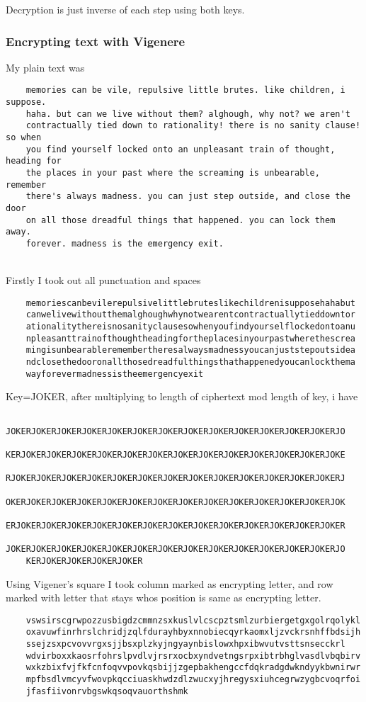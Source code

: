 \documentclass[10pt]{article}
\begin{document}
  Decryption is just inverse of each step using both keys.

  \subsubsection{Encrypting text with Vigenere}
  My plain text was 
  \begin{verbatim}
  	memories can be vile, repulsive little brutes. like children, i suppose.
  	haha. but can we live without them? alghough, why not? we aren't 
  	contractually tied down to rationality! there is no sanity clause! so when
  	you find yourself locked onto an unpleasant train of thought, heading for
  	the places in your past where the screaming is unbearable, remember
  	there's always madness. you can just step outside, and close the door
  	on all those dreadful things that happened. you can lock them away.
  	forever. madness is the emergency exit.
  \end{verbatim} \\
  Firstly I took out all punctuation and spaces \\
  \begin{verbatim}
  	memoriescanbevilerepulsivelittlebruteslikechildrenisupposehahabut
  	canwelivewithoutthemalghoughwhynotwearentcontractuallytieddowntor
  	ationalitythereisnosanityclausesowhenyoufindyourselflockedontoanu
  	npleasanttrainofthoughtheadingfortheplacesinyourpastwherethescrea
  	mingisunbearableremembertheresalwaysmadnessyoucanjuststepoutsidea
  	ndclosethedooronallthosedreadfulthingsthathappenedyoucanlockthema
  	wayforevermadnessistheemergencyexit
  \end{verbatim}
  Key=JOKER, after multiplying to length of ciphertext mod length of key, i have
  \begin{verbatim}
  	JOKERJOKERJOKERJOKERJOKERJOKERJOKERJOKERJOKERJOKERJOKERJOKERJOKERJO
  	KERJOKERJOKERJOKERJOKERJOKERJOKERJOKERJOKERJOKERJOKERJOKERJOKERJOKE
  	RJOKERJOKERJOKERJOKERJOKERJOKERJOKERJOKERJOKERJOKERJOKERJOKERJOKERJ
  	OKERJOKERJOKERJOKERJOKERJOKERJOKERJOKERJOKERJOKERJOKERJOKERJOKERJOK
  	ERJOKERJOKERJOKERJOKERJOKERJOKERJOKERJOKERJOKERJOKERJOKERJOKERJOKER
  	JOKERJOKERJOKERJOKERJOKERJOKERJOKERJOKERJOKERJOKERJOKERJOKERJOKERJO
  	KERJOKERJOKERJOKERJOKER
  \end{verbatim}

  Using Vigener's square I took column marked as encrypting letter, and row marked with letter that stays whos position is same as encrypting letter.

  \begin{verbatim}
  	vswsirscgrwpozzusbigdzcmmnzsxkuslvlcscpztsmlzurbiergetgxgolrqolykl
  	oxavuwfinrhrslchridjzqlfdurayhbyxnnobiecqyrkaomxljzvckrsnhffbdsijh
  	ssejzsxpcvovvrgxsjjbsxplzkyjngyaynbislowxhpxibwvutvsttsnsecckrl
  	wdvirboxxkaosrfohrslpvdlvjrsrxocbxyndvetngsrpxibtrbhglvasdlvbqbirv
  	wxkzbixfvjfkfcnfoqvvpovkqsbijjzgepbakhengccfdqkradgdwkndyykbwnirwr
  	mpfbsdlvmcyvfwovpkqcciuaskhwdzdlzwucxyjhregysxiuhcegrwzygbcvoqrfoi
  	jfasfiivonrvbgswkqsoqvauorthshmk
  \end{verbatim}
\end{document}
